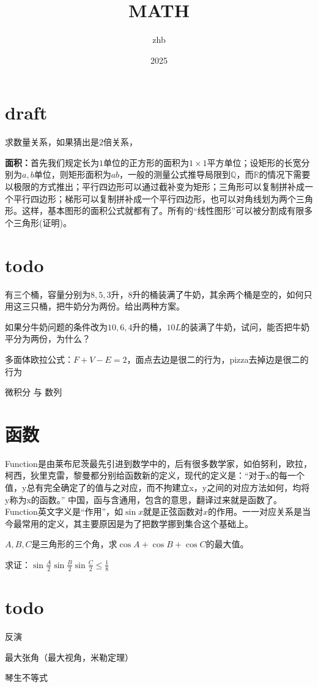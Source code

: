 \documentclass[12pt,fleqn]{article}
\title{MATH} \author{zhb} \date{2025}
\begin{document}
 \section{draft}

求数量关系，如果猜出是$2$倍关系，

\textbf{面积：}首先我们规定长为$1$单位的正方形的面积为$1\times 1$平方单位；设矩形的长宽分别为$a,b$单位，则矩形面积为$ab$，一般的测量公式推导局限到$\mathbb{Q}$，而$\mathbb{R}$的情况下需要以极限的方式推出；平行四边形可以通过截补变为矩形；三角形可以复制拼补成一个平行四边形；梯形可以复制拼补成一个平行四边形，也可以对角线划为两个三角形。这样，基本图形的面积公式就都有了。所有的“线性图形”可以被分割成有限多个三角形(证明)。





\section{todo}

 有三个桶，容量分别为$8,5,3$升，8升的桶装满了牛奶，其余两个桶是空的，如何只用这三只桶，把牛奶分为两份。给出两种方案。

 如果分牛奶问题的条件改为$10,6,4$升的桶，$10L$的装满了牛奶，试问，能否把牛奶平分为两份，为什么？

 多面体欧拉公式：$F+V-E=2$，面点去边是很二的行为，pizza去掉边是很二的行为

 微积分 与 数列

 \section{函数}
 Function是由莱布尼茨最先引进到数学中的，后有很多数学家，如伯努利，欧拉，柯西，狄里克雷，黎曼都分别给函数新的定义，现代的定义是：“对于x的每一个值，y总有完全确定了的值与之对应，而不拘建立x，y之间的对应方法如何，均将y称为x的函数。” 中国，函与含通用，包含的意思，翻译过来就是函数了。Function英文字义是“作用”，如$\sin x$就是正弦函数对$x$的作用。一一对应关系是当今最常用的定义，其主要原因是为了把数学挪到集合这个基础上。

$A,B,C$是三角形的三个角，求$\cos A+\cos B +\cos C$的最大值。

求证：$\sin \frac{A}{2} \sin \frac{B}{2} \sin \frac{C}{2} \le \frac{1}{8}$

\printsolutions

\section{todo}
反演

最大张角（最大视角，米勒定理）

琴生不等式
\end{document}
